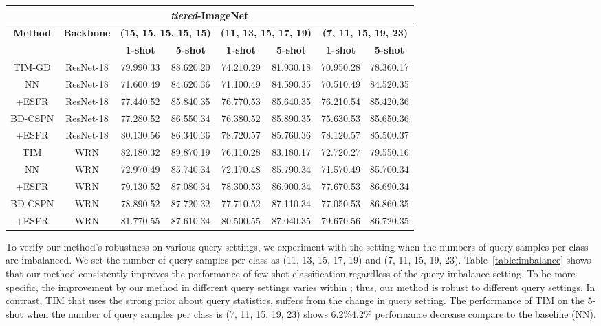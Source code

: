 \documentclass{article}
\begin{document}
\begin{table}[t]
\begin{small}
\begin{center}
\begin{tabular}{cccccccc}
				
				\multicolumn{8}{c}{\textbf{\textit{tiered}-ImageNet}} \\ \hline
				\multirow{2}{*}{\textbf{Method}} & \multirow{2}{*}{\textbf{Backbone}} & \multicolumn{2}{c}{\textbf{(15, 15, 15, 15, 15)}} & \multicolumn{2}{c}{\textbf{(11, 13, 15, 17, 19)}} & \multicolumn{2}{c}{\textbf{(7, 11, 15, 19, 23)}} \\
				&  & \textbf{1-shot} & \textbf{5-shot} & \textbf{1-shot} & \textbf{5-shot} & \textbf{1-shot} & \textbf{5-shot} \\ \hline
				TIM-GD & ResNet-18 & 79.990.33 & 88.620.20 & 74.210.29 & 81.930.18 & 70.950.28 & 78.360.17 \\ \hline
				NN & ResNet-18 & 71.600.49 & 84.620.36 & 71.100.49 & 84.590.35 & 70.510.49 & 84.520.35 \\
				\rowcolor[HTML]{EFEFEF}+ESFR & ResNet-18 & 77.440.52 & 85.840.35 & 76.770.53 & 85.640.35 & 76.210.54 & 85.420.36 \\ \hline
				BD-CSPN & ResNet-18 & 77.280.52 & 86.550.34 & 76.380.52 & 85.890.35 & 75.630.53 & 85.650.36 \\
				\rowcolor[HTML]{EFEFEF}+ESFR & ResNet-18 & 80.130.56 & 86.340.36 & 78.720.57 & 85.760.36 & 78.120.57 & 85.500.37 \\ \hline
				TIM & WRN & 82.180.32 & 89.870.19 & 76.110.28 & 83.180.17 & 72.720.27 & 79.550.16 \\ \hline
				NN & WRN & 72.970.49 & 85.740.34 & 72.170.48 & 85.790.34 & 71.570.49 & 85.700.34 \\
				\rowcolor[HTML]{EFEFEF}+ESFR & WRN & 79.130.52 & 87.080.34 & 78.300.53 & 86.900.34 & 77.670.53 & 86.690.34 \\ \hline
				BD-CSPN & WRN & 78.890.52 & 87.720.32 & 77.710.52 & 87.110.34 & 77.050.53 & 86.860.35 \\
				\rowcolor[HTML]{EFEFEF}+ESFR & WRN & 81.770.55 & 87.610.34 & 80.500.55 & 87.040.35 & 79.670.56 & 86.720.35 \\ \hline
			\end{tabular}
		\end{center}
	\end{small}
\end{table}
To verify our method's robustness on various query settings, we experiment with the setting when the numbers of query samples per class are imbalanced.
We set the number of query samples per class as (11, 13, 15, 17, 19) and (7, 11, 15, 19, 23).
Table~\ref{table:imbalance} shows that our method consistently improves the performance of few-shot classification regardless of the query imbalance setting.
To be more specific, the improvement by our method in different query settings varies within ; thus, our method is robust to different query settings.
In contrast, TIM \cite{TIM} that uses the strong prior about query statistics, suffers from the change in query setting.
The performance of TIM on the 5-shot when the number of query samples per class is (7, 11, 15, 19, 23) shows 6.2\%4.2\% performance decrease compare to the baseline (NN).
\end{document}
